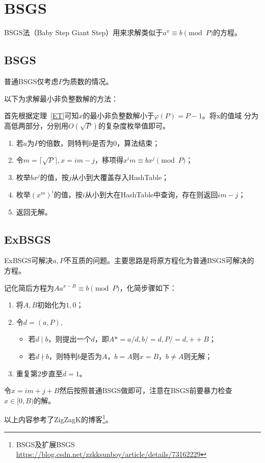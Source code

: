 \section{BSGS}
BSGS法（Baby Step Giant Step）用来求解类似于$a^x\equiv b\pmod{P}$的方程。
\subsection{BSGS}
普通BSGS仅考虑$P$为质数的情况。

以下为求解最小非负整数解的方法：

首先根据定理~\ref{ET}可知$x$的最小非负整数解小于$\varphi(P)=P-1$。将x的值域
分为高低两部分，分别用$O(\sqrt{P})$的复杂度枚举值即可。

\begin{enumerate}
    \item 若$a$为$P$的倍数，则特判$b$是否为$0$，算法结束；
    \item 令$m=\lceil\sqrt{P}\rceil,x=im-j$，移项得$x^im\equiv bx^j\pmod{P}$；
    \item 枚举$bx^j$的值，按$j$从小到大覆盖存入HashTable；
    \item 枚举$(x^m)^i$的值，按$i$从小到大在HashTable中查询，存在则返回$im-j$；
    \item 返回无解。
\end{enumerate}

\subsection{ExBSGS}
ExBSGS可解决$a,P$不互质的问题。主要思路是将原方程化为普通BSGS可解决的方程。

记化简后方程为$Aa^{x-B}\equiv b\pmod{P}$，化简步骤如下：
\begin{enumerate}
    \item 将$A,B$初始化为$1,0$；
    \item 令$d=(a,P)$,
    \begin{itemize}
        \item 若$d\mid b$，则提出一个$d$，即$A*=a/d,b/=d,P/=d,++B$；
        \item 若$d\nmid b$，则特判$b$是否为$A$，$b=A$则$x=B$，$b\neq A$则无解；
    \end{itemize}
    \item 重复第2步直至$d=1$。
\end{enumerate}
令$x=im+j+B$然后按照普通BSGS做即可，注意在BSGS前要暴力检查$x\in[0,B)$的解。

以上内容参考了ZigZagK的博客\footnote{BSGS及扩展BSGS
\url{https://blog.csdn.net/zzkksunboy/article/details/73162229}}。
